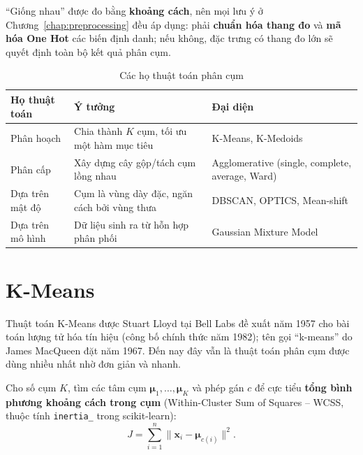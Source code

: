 ``Giống nhau'' được đo bằng \textbf{khoảng cách}, nên mọi lưu ý ở Chương~\ref{chap:preprocessing} đều áp dụng: phải \textbf{chuẩn hóa thang đo} và \textbf{mã hóa One Hot} các biến định danh; nếu không, đặc trưng có thang đo lớn sẽ quyết định toàn bộ kết quả phân cụm.

\begin{table}[H]
\centering
\begin{tabular}{|p{3cm}|p{5.5cm}|p{4.5cm}|}
\hline
\textbf{Họ thuật toán} & \textbf{Ý tưởng} & \textbf{Đại diện} \\
\hline
Phân hoạch & Chia thành $K$ cụm, tối ưu một hàm mục tiêu & K-Means, K-Medoids \\ \hline
Phân cấp & Xây dựng cây gộp/tách cụm lồng nhau & Agglomerative (single, complete, average, Ward) \\ \hline
Dựa trên mật độ & Cụm là vùng dày đặc, ngăn cách bởi vùng thưa & DBSCAN, OPTICS, Mean-shift \\ \hline
Dựa trên mô hình & Dữ liệu sinh ra từ hỗn hợp phân phối & Gaussian Mixture Model \\ \hline
\end{tabular}
\caption{Các họ thuật toán phân cụm}
\end{table}

\section{K-Means}

Thuật toán K-Means được Stuart Lloyd tại Bell Labs đề xuất năm 1957 cho bài toán lượng tử hóa tín hiệu (công bố chính thức năm 1982); tên gọi ``k-means'' do James MacQueen đặt năm 1967. Đến nay đây vẫn là thuật toán phân cụm được dùng nhiều nhất nhờ đơn giản và nhanh.

\begin{definition}
Cho số cụm $K$, tìm các tâm cụm $\boldsymbol{\mu}_1, \dots, \boldsymbol{\mu}_K$ và phép gán $c$ để cực tiểu \textbf{tổng bình phương khoảng cách trong cụm} (Within-Cluster Sum of Squares -- WCSS, thuộc tính \texttt{inertia\_} trong scikit-learn):
\begin{equation}
    J = \sum_{i=1}^{n} \big\|\mathbf{x}_i - \boldsymbol{\mu}_{c(i)}\big\|^2 .
\end{equation}
\end{definition}

